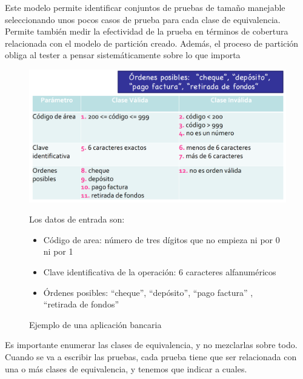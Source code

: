 Este modelo permite identificar conjuntos de pruebas de tamaño manejable seleccionando unos pocos casos de prueba para cada clase de equivalencia.
Permite también medir la efectividad de la prueba en términos de cobertura relacionada con el modelo de partición creado.
Además, el proceso de partición obliga al tester a pensar sistemáticamente sobre lo que importa

\begin{figure}[htbp]
   \centering
   \includegraphics{images/05/claseBanca.png}
   \caption{Ejemplo de una aplicación bancaria}
   {Los datos de entrada son:\ns
   \begin{itemize}
   	\item Código de area: número de tres dígitos que no empieza ni por 0 ni por 1
	\item Clave identificativa de la operación: 6 caracteres alfanuméricos
	\item Órdenes posibles: ``cheque'', ``depósito'', ``pago factura'' , ``retirada de fondos'' 
   \end{itemize}}
   \label{fig:05/claseBanca}
\end{figure}

Es importante enumerar las clases de equivalencia, y no mezclarlas sobre todo.
Cuando se va a escribir las pruebas, cada prueba tiene que ser relacionada con una o más clases de equivalencia, y tenemos que indicar a cuales.


